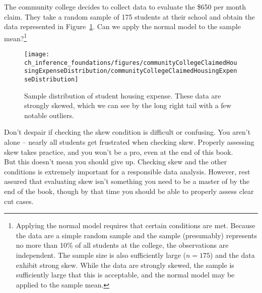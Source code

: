 \begin{exercise} \label{normalDistCondForHousingExpenseForCommunityCollege650}
The community college decides to collect data to evaluate the \$650 per month claim. They take a random sample of 175 students at their school and obtain the data represented in Figure~\ref{communityCollegeClaimedHousingExpenseDistribution}. Can we apply the normal model to the sample mean?\footnote{Applying the normal model requires that certain conditions are met. Because the data are a simple random sample and the sample (presumably) represents no more than 10\% of all students at the college, the observations are independent. The sample size is also sufficiently large ($n = 175$) and the data exhibit strong skew. While the data are strongly skewed, the sample is sufficiently large that this is acceptable, and the normal model may be applied to the sample mean.}

\begin{figure}
\centering
\texttt{[image: ch\_inference\_foundations/figures/communityCollegeClaimedHousingExpenseDistribution/communityCollegeClaimedHousingExpenseDistribution]}
\caption{Sample distribution of student housing expense. These data are strongly skewed, which we can see by the long right tail with a few notable outliers.}
\label{communityCollegeClaimedHousingExpenseDistribution}
\end{figure}
\end{exercise}

\begin{tipBox}{
Don't despair if checking the skew condition is difficult or confusing. You aren't alone -- nearly all students get frustrated when checking skew. Properly assessing skew takes practice, and you won't be a pro, even at the end of this book. \\[2mm]
But this doesn't mean you should give up. Checking skew and the other conditions is extremely important for a responsible data analysis. However, rest assured that evaluating skew isn't something you need to be a master of by the end of the book, though by that time you should be able to properly assess clear cut cases.}
\end{tipBox}

\textC{\newpage}

